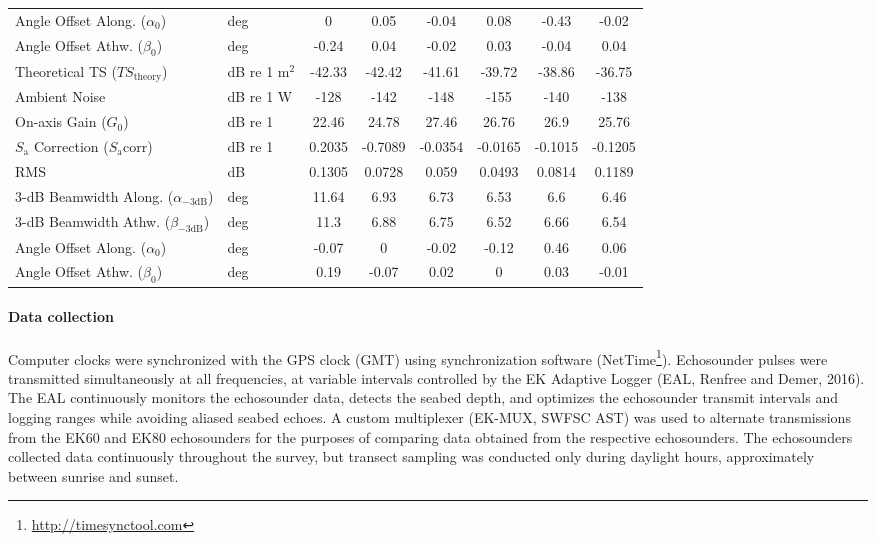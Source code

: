\documentclass[]{article}
\let\oldparagraph\paragraph
\renewcommand{\paragraph}[1]{\oldparagraph{#1}\mbox{}}
\let\rmarkdownfootnote\footnote%
\def\footnote{\protect\rmarkdownfootnote}
\begin{document}
\begin{table}[!h]
{\begin{tabular}{llcccccc}
Angle Offset Along. ($\alpha_{0}$) & deg & 0 & 0.05 & -0.04 & 0.08 & -0.43 & -0.02\\
Angle Offset Athw. ($\beta_{0}$) & deg & -0.24 & 0.04 & -0.02 & 0.03 & -0.04 & 0.04\\
Theoretical TS ($TS_\mathrm{theory}$) & dB re 1 m$^{2}$ & -42.33 & -42.42 & -41.61 & -39.72 & -38.86 & -36.75\\
Ambient Noise & dB re 1 W & -128 & -142 & -148 & -155 & -140 & -138\\
\hline
On-axis Gain ($G_0$) & dB re 1 & 22.46 & 24.78 & 27.46 & 26.76 & 26.9 & 25.76\\
$S_\mathrm{a}$ Correction ($S_\mathrm{a}\mathrm{corr}$) & dB re 1 & 0.2035 & -0.7089 & -0.0354 & -0.0165 & -0.1015 & -0.1205\\
RMS & dB & 0.1305 & 0.0728 & 0.059 & 0.0493 & 0.0814 & 0.1189\\
3-dB Beamwidth Along. ($\alpha_\mathrm{-3dB}$) & deg & 11.64 & 6.93 & 6.73 & 6.53 & 6.6 & 6.46\\
3-dB Beamwidth Athw. ($\beta_\mathrm{-3dB}$) & deg & 11.3 & 6.88 & 6.75 & 6.52 & 6.66 & 6.54\\
Angle Offset Along. ($\alpha_{0}$) & deg & -0.07 & 0 & -0.02 & -0.12 & 0.46 & 0.06\\
Angle Offset Athw. ($\beta_{0}$) & deg & 0.19 & -0.07 & 0.02 & 0 & 0.03 & -0.01\\
\bottomrule
\end{tabular}}
\end{table}



\hypertarget{methods-acoustic-data-collection}{%
\paragraph{Data collection}\label{methods-acoustic-data-collection}}

Computer clocks were synchronized with the GPS clock (GMT) using synchronization software (NetTime\footnote{\url{http://timesynctool.com}}). Echosounder pulses were transmitted simultaneously at all frequencies, at variable intervals controlled by the EK Adaptive Logger (EAL, Renfree and Demer, 2016). The EAL continuously monitors the echosounder data, detects the seabed depth, and optimizes the echosounder transmit intervals and logging ranges while avoiding aliased seabed echoes. A custom multiplexer (EK-MUX, SWFSC AST) was used to alternate transmissions from the EK60 and EK80 echosounders for the purposes of comparing data obtained from the respective echosounders. The echosounders collected data continuously throughout the survey, but transect sampling was conducted only during daylight hours, approximately between sunrise and sunset.
\end{document}
